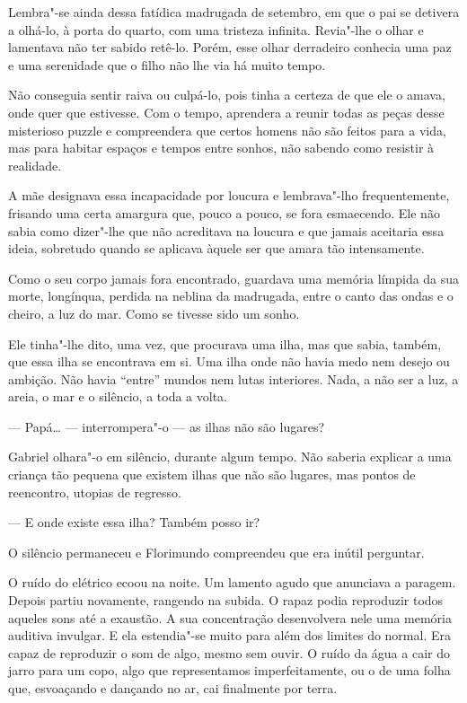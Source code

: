 Lembra"-se ainda dessa fatídica madrugada de setembro, em que o pai se
detivera a olhá-lo, à porta do quarto, com uma tristeza infinita.
Revia"-lhe o olhar e lamentava não ter sabido retê-lo. Porém, esse olhar
derradeiro conhecia uma paz e uma serenidade que o filho não lhe via há
muito tempo.

Não conseguia sentir raiva ou culpá-lo, pois tinha a certeza de que ele
o amava, onde quer que estivesse. Com o tempo, aprendera a reunir todas
as peças desse misterioso puzzle e compreendera que certos homens não
são feitos para a vida, mas para habitar espaços e tempos entre sonhos,
não sabendo como resistir à realidade.

A mãe designava essa incapacidade por loucura e lembrava"-lho
frequentemente, frisando uma certa amargura que, pouco a pouco, se fora
esmaecendo. Ele não sabia como dizer"-lhe que não acreditava na loucura e
que jamais aceitaria essa ideia, sobretudo quando se aplicava àquele ser
que amara tão intensamente.

Como o seu corpo jamais fora encontrado, guardava uma memória límpida da
sua morte, longínqua, perdida na neblina da madrugada, entre o canto das
ondas e o cheiro, a luz do mar. Como se tivesse sido um sonho.

Ele tinha"-lhe dito, uma vez, que procurava uma ilha, mas que sabia,
também, que essa ilha se encontrava em si. Uma ilha onde não havia medo
nem desejo ou ambição. Não havia ``entre'' mundos nem lutas interiores.
Nada, a não ser a luz, a areia, o mar e o silêncio, a toda a volta.

--- Papá\ldots{} --- interrompera"-o --- as ilhas não são lugares?

Gabriel olhara"-o em silêncio, durante algum tempo. Não saberia explicar
a uma criança tão pequena que existem ilhas que não são lugares, mas
pontos de reencontro, utopias de regresso.

--- E onde existe essa ilha? Também posso ir?

O silêncio permaneceu e Florimundo compreendeu que era inútil perguntar.

O ruído do elétrico ecoou na noite. Um lamento agudo que anunciava a
paragem. Depois partiu novamente, rangendo na subida. O rapaz podia
reproduzir todos aqueles sons até a exaustão. A sua concentração
desenvolvera nele uma memória auditiva invulgar. E ela estendia"-se muito
para além dos limites do normal. Era capaz de reproduzir o som de algo,
mesmo sem ouvir. O ruído da água a cair do jarro para um copo, algo que
representamos imperfeitamente, ou o de uma folha que, esvoaçando e
dançando no ar, cai finalmente por terra.

